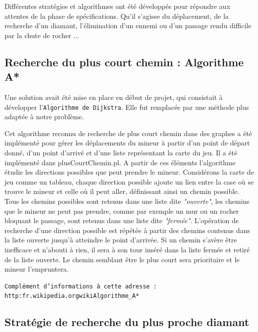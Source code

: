 \documentclass[a4paper,11pt]{article}
\begin{document}
Différentes stratégies et algorithmes ont été développés pour répondre aux attentes de la phase de spécifications.  Qu’il s’agisse du déplacement, de la recherche d’un diamant, l’élimination d’un ennemi ou d'un passage rendu difficile par la chute de rocher ...\\

	\subsection{Recherche du plus court chemin : Algorithme A*}
	
Une solution avait été mise en place en début de projet, qui consistait à développer l'\texttt{Algorithme de Dijkstra}. Elle fut remplacée par une méthode plus adaptée à notre problème.
		
Cet algorithme reconnu de recherche de plus court chemin dans des graphes a été implémenté pour gérer les déplacements du mineur à partir d’un point de départ donné, d’un point d’arrivé et d’une liste représentant la carte du jeu. Il a été implémenté dans plusCourtChemin.pl. A partir de ces éléments l’algorithme étudie les directions possibles que peut prendre le mineur. Considérons la carte de jeu comme un tableau, chaque direction possible ajoute un lien entre la case où se trouve le mineur et celle où il peut aller, définissant ainsi un chemin possible. Tous les chemins possibles sont retenus dans une liste dite \textit{"ouverte"}, les chemins que le mineur ne peut pas prendre, comme par exemple un mur ou un rocher bloquant le passage, sont retenus dans une liste dite \textit{"fermée"}.  L’opération de recherche d’une direction possible est répétée à partir des chemins contenus dans la liste ouverte jusqu’à atteindre le point d’arrivée. Si un chemin s’avère être inefficace et n’abouti à rien, il sera à son tour inséré dans la liste fermée et retiré de la liste ouverte. Le chemin semblant être le plus court sera prioritaire et le mineur l’empruntera.

\begin{center}
\texttt{Complément d'informations à cette adresse : \\http:\/\/fr.wikipedia.org\/wiki\/Algorithme\_A*}
\end{center}

	\subsection{Stratégie de recherche du plus proche diamant}
	
\end{document}
